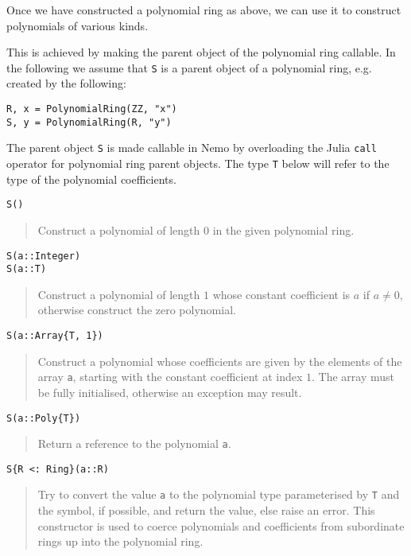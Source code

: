 \documentclass[a4paper,10pt]{article}
\newcommand{\code}{\lstinline}
\newcommand{\desc}[1]{\vspace{-3mm}\begin{quote}#1\end{quote}}
\begin{document}
Once we have constructed a polynomial ring as above, we can use it to construct
polynomials of various kinds.

This is achieved by making the parent object of the polynomial ring callable. In the
following we assume that \code{S} is a parent object of a polynomial ring, e.g.
created by the following:

\begin{lstlisting}
R, x = PolynomialRing(ZZ, "x")
S, y = PolynomialRing(R, "y")
\end{lstlisting}

The parent object \code{S} is made callable in Nemo by overloading the Julia
\code{call} operator for polynomial ring parent objects. The type \code{T}
below will refer to the type of the polynomial coefficients.

\begin{lstlisting}
S()
\end{lstlisting}

\desc{Construct a polynomial of length $0$ in the given polynomial ring.}

\begin{lstlisting}
S(a::Integer)
S(a::T)
\end{lstlisting}

\desc{Construct a polynomial of length $1$ whose constant coefficient is $a$ if
$a \neq 0$, otherwise construct the zero polynomial.}

\begin{lstlisting}
S(a::Array{T, 1})
\end{lstlisting}

\desc{Construct a polynomial whose coefficients are given by the elements of the array
\code{a}, starting with the constant coefficient at index $1$. The array must be fully
initialised, otherwise an exception may result.}

\begin{lstlisting}
S(a::Poly{T})
\end{lstlisting}

\desc{Return a reference to the polynomial \code{a}.}

\begin{lstlisting}
S{R <: Ring}(a::R)
\end{lstlisting}

\desc{Try to convert the value \code{a} to the polynomial type parameterised by 
\code{T} and the symbol, if possible, and return the value, else raise an error. 
This constructor is used to coerce polynomials and coefficients from subordinate rings
up into the polynomial ring.}
\end{document}
